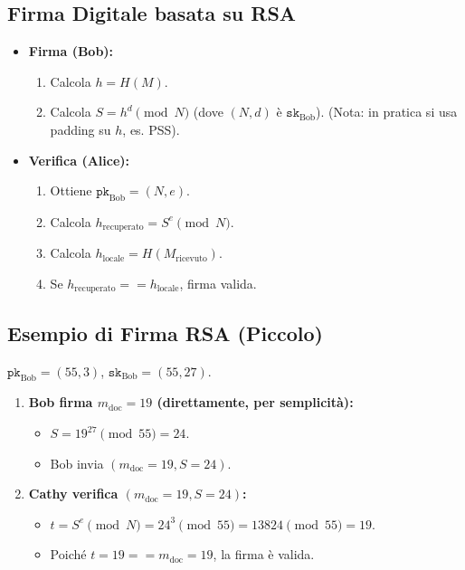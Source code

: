 \subsection{Firma Digitale basata su RSA}
\begin{itemize}
    \item \textbf{Firma (Bob):}
    \begin{enumerate}
        \item Calcola $h = H(M)$.
        \item Calcola $S = h^d \pmod N$ (dove $(N,d)$ è $\texttt{sk}_{\text{Bob}}$).
        (Nota: in pratica si usa padding su $h$, es. PSS).
    \end{enumerate}
    \item \textbf{Verifica (Alice):}
    \begin{enumerate}
        \item Ottiene $\texttt{pk}_{\text{Bob}} = (N,e)$.
        \item Calcola $h_{\text{recuperato}} = S^e \pmod N$.
        \item Calcola $h_{\text{locale}} = H(M_{\text{ricevuto}})$.
        \item Se $h_{\text{recuperato}} == h_{\text{locale}}$, firma valida.
    \end{enumerate}
\end{itemize}

\subsection{Esempio di Firma RSA (Piccolo)}
$\texttt{pk}_{\text{Bob}} = (55, 3)$, $\texttt{sk}_{\text{Bob}} = (55, 27)$.
\begin{enumerate}
    \item \textbf{Bob firma $m_{\text{doc}}=19$ (direttamente, per semplicità):}
    \begin{itemize}
        \item $S = 19^{27} \pmod{55} = 24$.
        \item Bob invia $(m_{\text{doc}}=19, S=24)$.
    \end{itemize}
    \item \textbf{Cathy verifica $(m_{\text{doc}}=19, S=24)$:}
    \begin{itemize}
        \item $t = S^e \pmod N = 24^3 \pmod{55} = 13824 \pmod{55} = 19$.
        \item Poiché $t=19 == m_{\text{doc}}=19$, la firma è valida.
    \end{itemize}
\end{enumerate}

